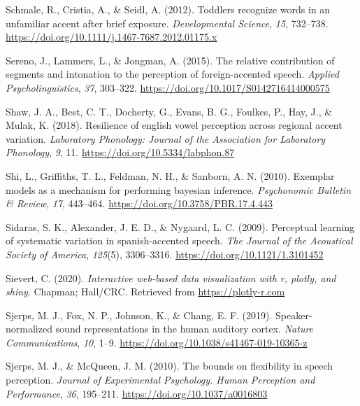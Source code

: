 \documentclass[
  11pt,
  english,
  man,floatsintext]{apa6}
\newlength{\cslhangindent}
\newlength{\cslentryspacingunit} %
\newenvironment{CSLReferences}[2] %
 {%
  \setlength{\parindent}{0pt}
  \ifodd #1
  \let\oldpar\par
  \def\par{\hangindent=\cslhangindent\oldpar}
  \fi
  \setlength{\parskip}{#2\cslentryspacingunit}
 }%
 {}
\begin{document}
\begin{CSLReferences}{1}{0}
\leavevmode{}%
Schmale, R., Cristia, A., \& Seidl, A. (2012). Toddlers recognize words in an unfamiliar accent after brief exposure. \emph{Developmental Science}, \emph{15}, 732--738. \url{https://doi.org/10.1111/j.1467-7687.2012.01175.x}

\leavevmode{}%
Sereno, J., Lammers, L., \& Jongman, A. (2015). The relative contribution of segments and intonation to the perception of foreign-accented speech. \emph{Applied Psycholinguistics}, \emph{37}, 303--322. \url{https://doi.org/10.1017/S0142716414000575}

\leavevmode{}%
Shaw, J. A., Best, C. T., Docherty, G., Evans, B. G., Foulkes, P., Hay, J., \& Mulak, K. (2018). Resilience of english vowel perception across regional accent variation. \emph{Laboratory Phonology: Journal of the Association for Laboratory Phonology}, \emph{9}, 11. \url{https://doi.org/10.5334/labphon.87}

\leavevmode{}%
Shi, L., Griffiths, T. L., Feldman, N. H., \& Sanborn, A. N. (2010). Exemplar models as a mechanism for performing bayesian inference. \emph{Psychonomic Bulletin \& Review}, \emph{17}, 443--464. \url{https://doi.org/10.3758/PBR.17.4.443}

\leavevmode{}%
Sidaras, S. K., Alexander, J. E. D., \& Nygaard, L. C. (2009). Perceptual learning of systematic variation in spanish-accented speech. \emph{The Journal of the Acoustical Society of America}, \emph{125}(5), 3306--3316. \url{https://doi.org/10.1121/1.3101452}

\leavevmode{}%
Sievert, C. (2020). \emph{Interactive web-based data visualization with r, plotly, and shiny}. Chapman; Hall/CRC. Retrieved from \url{https://plotly-r.com}

\leavevmode{}%
Sjerps, M. J., Fox, N. P., Johnson, K., \& Chang, E. F. (2019). Speaker-normalized sound representations in the human auditory cortex. \emph{Nature Communications}, \emph{10}, 1--9. \url{https://doi.org/10.1038/s41467-019-10365-z}

\leavevmode{}%
Sjerps, M. J., \& McQueen, J. M. (2010). The bounds on flexibility in speech perception. \emph{Journal of Experimental Psychology. Human Perception and Performance}, \emph{36}, 195--211. \url{https://doi.org/10.1037/a0016803}


\end{CSLReferences}
\end{document}
